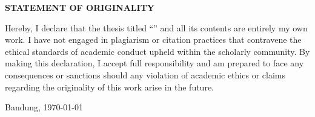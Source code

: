 \clearpage
{}
\begin{center}
 \textbf{\large STATEMENT OF ORIGINALITY}\\[3em]
\end{center}
\noindent Hereby, I declare that the thesis titled  
\enquote{\judulcapitalized} and all its contents are entirely my own work. I have not engaged in plagiarism or citation practices that contravene the ethical standards of academic conduct upheld within the scholarly community. By making this declaration, I accept full responsibility and am prepared to face any consequences or sanctions should any violation of academic ethics or claims regarding the originality of this work arise in the future.

\begin{flushright}
Bandung, \today{}\\[2cm]
\penulis{}\\
\nim{}
\end{flushright}

